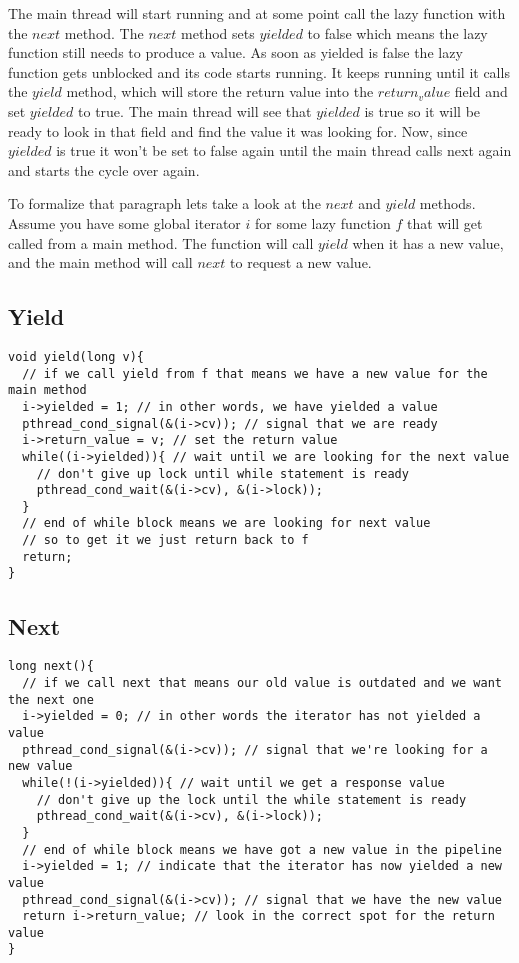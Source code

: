 \documentclass[12pt]{article}
\begin{document}
    The main thread will start running and at some point call the lazy function with the $next$ method. The $next$ method sets $yielded$ to false which means the lazy function still needs to produce a value. As soon as yielded is false the lazy function gets unblocked and its code starts running. It keeps running until it calls the $yield$ method, which will store the return value into the $return_value$ field and set $yielded$ to true. The main thread will see that $yielded$ is true so it will be ready to look in that field and find the value it was looking for. Now, since $yielded$ is true it won't be set to false again until the main thread calls next again and starts the cycle over again. 

    To formalize that paragraph lets take a look at the $next$ and $yield$ methods. Assume you have some global iterator $i$ for some lazy function $f$ that will get called from a main method. The function will call $yield$ when it has a new value, and the main method will call $next$ to request a new value. 

    \subsection{Yield}
\begin{verbatim}
void yield(long v){
  // if we call yield from f that means we have a new value for the main method
  i->yielded = 1; // in other words, we have yielded a value
  pthread_cond_signal(&(i->cv)); // signal that we are ready
  i->return_value = v; // set the return value
  while((i->yielded)){ // wait until we are looking for the next value 
    // don't give up lock until while statement is ready
    pthread_cond_wait(&(i->cv), &(i->lock)); 
  } 
  // end of while block means we are looking for next value 
  // so to get it we just return back to f
  return;
}
\end{verbatim}

    \subsection{Next}

\begin{verbatim}
long next(){
  // if we call next that means our old value is outdated and we want the next one
  i->yielded = 0; // in other words the iterator has not yielded a value
  pthread_cond_signal(&(i->cv)); // signal that we're looking for a new value
  while(!(i->yielded)){ // wait until we get a response value
    // don't give up the lock until the while statement is ready
    pthread_cond_wait(&(i->cv), &(i->lock)); 
  }
  // end of while block means we have got a new value in the pipeline
  i->yielded = 1; // indicate that the iterator has now yielded a new value
  pthread_cond_signal(&(i->cv)); // signal that we have the new value
  return i->return_value; // look in the correct spot for the return value
}
\end{verbatim}
\end{document}

